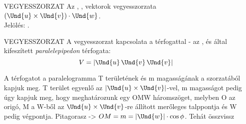 \begin{definicio}{VEGYESSZORZAT}
Az , ,   vektorok vegyesszorzata $(\Und{u}\times\Und{v})\cdot\Und{w}$.\\Jelölés:   .
\end{definicio}

\begin{tetel}{VEGYESSZORZAT}
A vegyesszorzat kapcsolata a térfogattal - az ,  és  által kifeszített \textit{paralelepipedon} térfogata:
$$V = |\Und{u}\, \Und{v}\, \Und{v}|$$
\end{tetel}

\begin{bizonyitas}{}
A térfogatot a paralelogramma T területének és m magasságának a szorzatából kapjuk meg. T terület egyenlő az $|\Und{u}\times\Und{v}|$-vel, m magasságot pedig úgy kapjuk meg, hogy meghatározunk egy OMW háromszöget, melyben O az origó, M a W-ből az $\Und{u}\times\Und{v}$-re állított merőleges talppontja és W pedig  végpontja. Pitagorasz -> $OM = m = |\Und{w}| \cdot \cos\phi$. Tehát összvissz
\end{bizonyitas}



